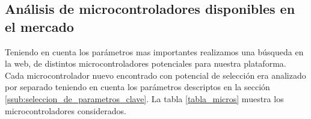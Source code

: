 
\subsection{Análisis de microcontroladores disponibles en el mercado} %
\label{it1:sub:analisis_de_microcontroladores}

Teniendo en cuenta los parámetros mas importantes realizamos una búsqueda en la web, de distintos microcontroladores potenciales para nuestra plataforma. Cada microcontrolador nuevo encontrado con potencial de selección era analizado por separado teniendo en cuenta los parámetros descriptos en la sección \ref{ssub:seleccion_de_parametros_clave}. La tabla \ref{tabla_micros} muestra los microcontroladores considerados.

